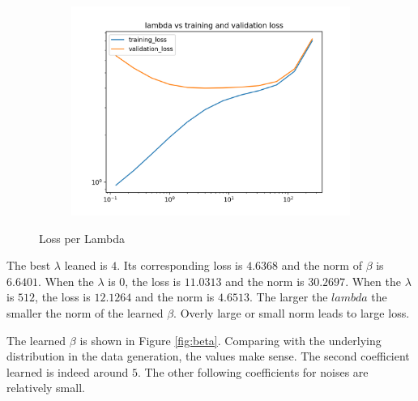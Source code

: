 \documentclass[11pt]{article}
\begin{document}
\begin{enumerate}
\begin{figure}[!h]
  \centering
  \begin{subfigure}[b]{0.4\linewidth}
    \includegraphics[width=\linewidth]{figures/lambda_loss.png}
  \end{subfigure}
  \caption{Loss per Lambda}
  \label{fig:lambda_loss}
\end{figure}

\medskip

The best $\lambda$ leaned is $4$. Its corresponding loss is $4.6368$ and the norm of $\beta$ is $6.6401$. When the $\lambda$ is $0$, the loss is $11.0313$ and the norm is $30.2697$. When the $\lambda$ is $512$, the loss is $12.1264$ and the norm is $4.6513$. The larger the $lambda$ the smaller the norm of the learned $\beta$. Overly large or small norm leads to large loss.

\medskip

The learned $\beta$ is shown in Figure \ref{fig:beta}. Comparing with the underlying distribution in the data generation, the values make sense. The second coefficient learned is indeed around $5$. The other following coefficients for noises are relatively small.


\end{enumerate}
\end{document}
